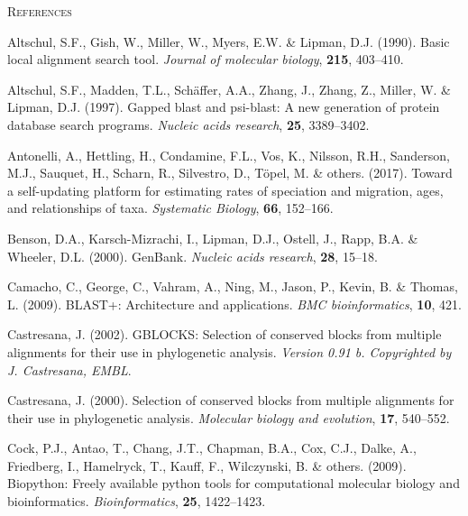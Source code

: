 \documentclass[]{article}
\begin{document}
\newpage
\begin{center}
\textsc{References}
\end{center}

\hypertarget{refs}{}
\leavevmode\hypertarget{ref-altschul1990basic}{}%
Altschul, S.F., Gish, W., Miller, W., Myers, E.W. \& Lipman, D.J. (1990). Basic local alignment search tool. \emph{Journal of molecular biology}, \textbf{215}, 403--410.

\leavevmode\hypertarget{ref-altschul1997gapped}{}%
Altschul, S.F., Madden, T.L., Schäffer, A.A., Zhang, J., Zhang, Z., Miller, W. \& Lipman, D.J. (1997). Gapped blast and psi-blast: A new generation of protein database search programs. \emph{Nucleic acids research}, \textbf{25}, 3389--3402.

\leavevmode\hypertarget{ref-antonelli2017toward}{}%
Antonelli, A., Hettling, H., Condamine, F.L., Vos, K., Nilsson, R.H., Sanderson, M.J., Sauquet, H., Scharn, R., Silvestro, D., Töpel, M. \& others. (2017). Toward a self-updating platform for estimating rates of speciation and migration, ages, and relationships of taxa. \emph{Systematic Biology}, \textbf{66}, 152--166.

\leavevmode\hypertarget{ref-benson2000genbank}{}%
Benson, D.A., Karsch-Mizrachi, I., Lipman, D.J., Ostell, J., Rapp, B.A. \& Wheeler, D.L. (2000). GenBank. \emph{Nucleic acids research}, \textbf{28}, 15--18.

\leavevmode\hypertarget{ref-camacho2009blast}{}%
Camacho, C., George, C., Vahram, A., Ning, M., Jason, P., Kevin, B. \& Thomas, L. (2009). BLAST+: Architecture and applications. \emph{BMC bioinformatics}, \textbf{10}, 421.

\leavevmode\hypertarget{ref-castresana2002gblocks}{}%
Castresana, J. (2002). GBLOCKS: Selection of conserved blocks from multiple alignments for their use in phylogenetic analysis. \emph{Version 0.91 b. Copyrighted by J. Castresana, EMBL}.

\leavevmode\hypertarget{ref-castresana2000selection}{}%
Castresana, J. (2000). Selection of conserved blocks from multiple alignments for their use in phylogenetic analysis. \emph{Molecular biology and evolution}, \textbf{17}, 540--552.

\leavevmode\hypertarget{ref-cock2009biopython}{}%
Cock, P.J., Antao, T., Chang, J.T., Chapman, B.A., Cox, C.J., Dalke, A., Friedberg, I., Hamelryck, T., Kauff, F., Wilczynski, B. \& others. (2009). Biopython: Freely available python tools for computational molecular biology and bioinformatics. \emph{Bioinformatics}, \textbf{25}, 1422--1423.
\end{document}
